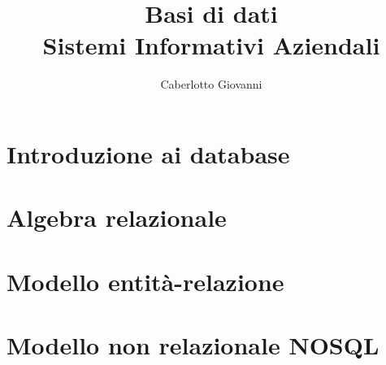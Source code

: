 \documentclass{report}
\title{\Huge{Basi di dati}\\Sistemi Informativi Aziendali}
\author{\huge{Caberlotto Giovanni}}
\date{}
\begin{document}
\maketitle
\newpage%
\tableofcontents
\pagebreak

\chapter{Introduzione ai database} %
\label{chap:Introduzione ai database}


\chapter{Algebra relazionale} %
\label{chap:Algebra relazionale}


\chapter{Modello entità-relazione} %
\label{chap:Modello entità-relazione}


\chapter{Modello non relazionale NOSQL} %
\label{chap:Modello non relazionale NOSQL}

\end{document}
